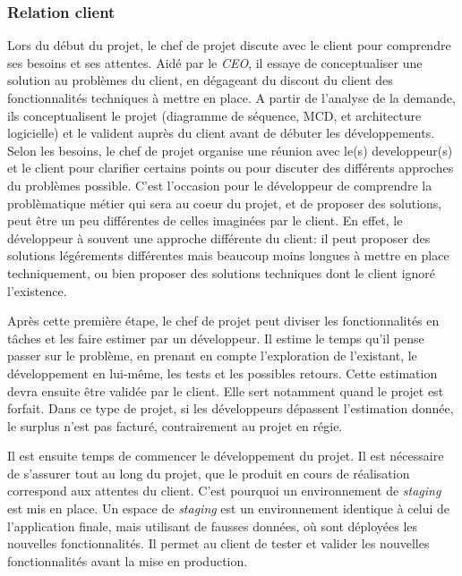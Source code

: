 \documentclass[12pt,a4paper]{article}
\begin{document}
  \subsubsection{Relation client}\label{relation-client}

  \bigskip

  Lors du début du projet, le chef de projet discute avec le client pour
  comprendre ses besoins et ses attentes. Aidé par le \emph{CEO}, il
  essaye de conceptualiser une solution au problèmes du client, en
  dégageant du discout du client des fonctionnalités techniques à mettre
  en place. A partir de l'analyse de la demande, ils conceptualisent le
  projet (diagramme de séquence, MCD, et architecture logicielle) et le
  valident auprès du client avant de débuter les développements. Selon les
  besoins, le chef de projet organise une réunion avec le(s)
  developpeur(s) et le client pour clarifier certains points ou pour
  discuter des différents approches du problèmes possible. C'est
  l'occasion pour le développeur de comprendre la problèmatique métier qui
  sera au coeur du projet, et de proposer des solutions, peut être un peu
  différentes de celles imaginées par le client. En effet, le développeur
  à souvent une approche différente du client: il peut proposer des
  solutions légérements différentes mais beaucoup moins longues à mettre
  en place techniquement, ou bien proposer des solutions techniques dont
  le client ignoré l'existence.

  \bigskip

  Après cette première étape, le chef de projet peut diviser les
  fonctionnalités en tâches et les faire estimer par un développeur. Il
  estime le temps qu'il pense passer sur le problème, en prenant en compte
  l'exploration de l'existant, le développement en lui-même, les tests et
  les possibles retours. Cette estimation devra ensuite être validée par
  le client. Elle sert notamment quand le projet est forfait. Dans ce type
  de projet, si les développeurs dépassent l'estimation donnée, le surplus
  n'est pas facturé, contrairement au projet en régie.

  \bigskip

  Il est ensuite temps de commencer le développement du projet. Il est
  nécessaire de s'assurer tout au long du projet, que le produit en cours
  de réalisation correspond aux attentes du client. C'est pourquoi un
  environnement de \emph{staging} est mis en place. Un espace de
  \emph{staging} est un environnement identique à celui de l'application
  finale, mais utilisant de fausses données, où sont déployées les
  nouvelles fonctionnalités. Il permet au client de tester et valider les
  nouvelles fonctionnalités avant la mise en production.
\end{document}
